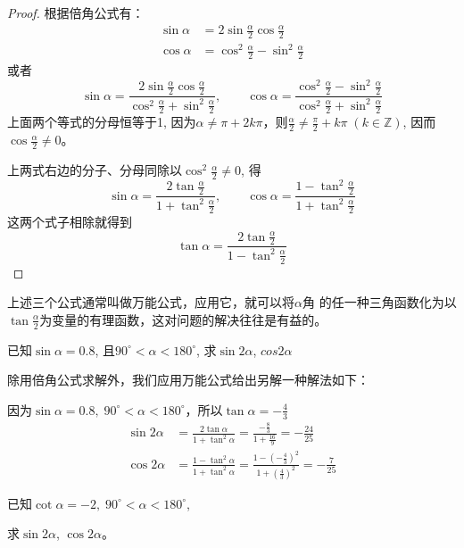 \begin{proof}
根据倍角公式有：
\[\begin{split}
    \sin\alpha &=2\sin\frac{\alpha}{2}\cos\frac{\alpha}{2}\\
    \cos\alpha &=\cos^2\frac{\alpha}{2}-\sin^2\frac{\alpha}{2}
\end{split}\]
或者
\[\sin\alpha=\frac{2\sin\frac{\alpha}{2}\cos\frac{\alpha}{2}}{\cos^2\frac{\alpha}{2}+\sin^2\frac{\alpha}{2}},\qquad \cos\alpha=\frac{\cos^2\frac{\alpha}{2}-\sin^2\frac{\alpha}{2}}{\cos^2\frac{\alpha}{2}+\sin^2\frac{\alpha}{2}}\]
上面两个等式的分母恒等于1, 因为$\alpha\ne \pi+2k\pi$，则$\frac{\alpha}{2}\ne \frac{\pi}{2}+k\pi\; (k\in\mathbb{Z})$, 因而$\cos\frac{\alpha}{2}\ne 0$。

上两式右边的分子、分母同除以$\cos^2\frac{\alpha}{2}\ne 0$, 得
\[\sin\alpha =\frac{2\tan\frac{\alpha}{2}}{1+\tan^2\frac{\alpha}{2}},\qquad
\cos\alpha=\frac{1-\tan^2\frac{\alpha}{2}}{1+\tan^2\frac{\alpha}{2}}\]
这两个式子相除就得到
\[\tan\alpha=\frac{2\tan\frac{\alpha}{2}}{1-\tan^2\frac{\alpha}{2}}\]
\end{proof}

上述三个公式通常叫做万能公式，应用它，就可以将$\alpha$角
的任一种三角函数化为以$\tan\frac{\alpha}{2}$为变量的有理函数，这对问题的解决往往是有益的。

\begin{example}
已知$\sin\alpha=0.8$, 且$90^{\circ}<\alpha<180^{\circ}$,
求$\sin2\alpha$, $cos2\alpha$

\end{example}

\begin{solution}
   除用倍角公式求解外，我们应用万能公式给出另解一种解法如下： 

因为$\sin\alpha=0.8,\; 90^{\circ}<\alpha<180^{\circ}$，所以$\tan\alpha=-\frac{4}{3}$
\[\begin{split}
    \sin2\alpha&=\frac{2\tan\alpha}{1+\tan^2\alpha}=\frac{-\frac{8}{3}}{1+\frac{16}{9}}=-\frac{24}{25} \\
    \cos2\alpha&=\frac{1-\tan^2\alpha}{1+\tan^2\alpha}=\frac{1-\left(-\frac{4}{3}\right)^2}{1+\left(\frac{4}{3}\right)^2}=-\frac{7}{25}
\end{split}  \]
\end{solution}


\begin{example}
已知$\cot\alpha=-2,\; 90^{\circ}<\alpha<180^{\circ}$, 

求$\sin2\alpha$, $\cos2\alpha$。
\end{example}

